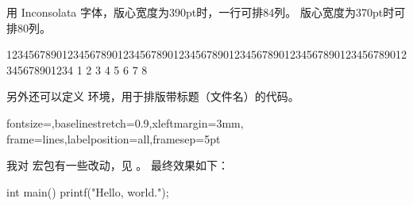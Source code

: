 用 { Inconsolata} 字体，版心宽度为390pt时，一行可排84列。
版心宽度为370pt时可排80列。
\makeatletter
{}
\makeatother
\begin{Code}[fontfamily=inconsolata]
123456789012345678901234567890123456789012345678901234567890123456789012345678901234
         1         2         3         4         5         6         7         8
\end{Code}

另外还可以定义 环境，用于排版带标题（文件名）的代码。

\begin{Code}
%
  {fontsize=\small,baselinestretch=0.9,xleftmargin=3mm,%
  frame=lines,labelposition=all,framesep=5pt}
\end{Code}

我对  宏包有一些改动，见 。
最终效果如下：
\begin{Codex}[label=hello.c,numbers=left]
int main()
{
  printf("Hello, world.\n");
}
\end{Codex}

